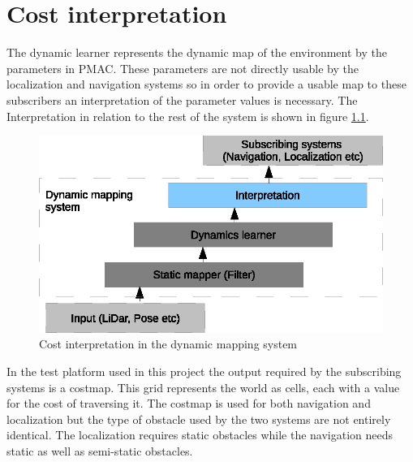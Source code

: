 \chapter{Cost interpretation}
The dynamic learner represents the dynamic map of the environment by the parameters in PMAC. These parameters are not directly usable by the localization and navigation systems so in order to provide a usable map to these subscribers an interpretation of the parameter values is necessary. The Interpretation in relation to the rest of the system is shown in figure \ref{fig:cost_overview}.
\\
\begin{figure}[htbp]
	\centering
	\includegraphics[scale=1]{chapters/cost_interpretation/figures/cost_overview.eps}
	\caption{Cost interpretation in the dynamic mapping system}
	\label{fig:cost_overview}
\end{figure}

In the test platform used in this project the output required by the subscribing systems is a costmap. This grid represents the world as cells, each with a value for the cost of traversing it. 
The costmap is used for both navigation and localization but the type of obstacle used by the two systems are not entirely identical. The localization requires static obstacles while the navigation needs static as well as semi-static obstacles. 







